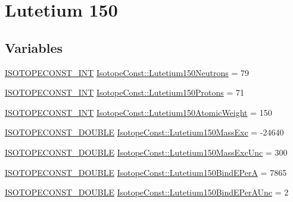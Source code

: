\hypertarget{group___isotope_const-_lutetium-_lu150}{}\section{Lutetium 150}
\label{group___isotope_const-_lutetium-_lu150}
\subsection*{Variables}
\begin{DoxyCompactItemize}
\item 
\mbox{\hyperlink{group___isotope_const-_macros_ga5f18360b3e99483a35c32d789e62621c}{I\+S\+O\+T\+O\+P\+E\+C\+O\+N\+S\+T\+\_\+\+I\+NT}} \mbox{\hyperlink{group___isotope_const-_lutetium-_lu150_ga0face9809013d9d7120bab64be048471}{Isotope\+Const\+::\+Lutetium150\+Neutrons}} = 79
\item 
\mbox{\hyperlink{group___isotope_const-_macros_ga5f18360b3e99483a35c32d789e62621c}{I\+S\+O\+T\+O\+P\+E\+C\+O\+N\+S\+T\+\_\+\+I\+NT}} \mbox{\hyperlink{group___isotope_const-_lutetium-_lu150_ga98659f94cfe65d69b218bcfa981c9f98}{Isotope\+Const\+::\+Lutetium150\+Protons}} = 71
\item 
\mbox{\hyperlink{group___isotope_const-_macros_ga5f18360b3e99483a35c32d789e62621c}{I\+S\+O\+T\+O\+P\+E\+C\+O\+N\+S\+T\+\_\+\+I\+NT}} \mbox{\hyperlink{group___isotope_const-_lutetium-_lu150_ga633669483099b9b6863d16f018193497}{Isotope\+Const\+::\+Lutetium150\+Atomic\+Weight}} = 150
\item 
\mbox{\hyperlink{group___isotope_const-_macros_ga8f45a7272ce02c0b4c65c44636ed719a}{I\+S\+O\+T\+O\+P\+E\+C\+O\+N\+S\+T\+\_\+\+D\+O\+U\+B\+LE}} \mbox{\hyperlink{group___isotope_const-_lutetium-_lu150_ga2fc9d0c5eda09ada03fd0eca210cc907}{Isotope\+Const\+::\+Lutetium150\+Mass\+Exc}} = -\/24640
\item 
\mbox{\hyperlink{group___isotope_const-_macros_ga8f45a7272ce02c0b4c65c44636ed719a}{I\+S\+O\+T\+O\+P\+E\+C\+O\+N\+S\+T\+\_\+\+D\+O\+U\+B\+LE}} \mbox{\hyperlink{group___isotope_const-_lutetium-_lu150_ga9104f8d89702984a3599350263017f30}{Isotope\+Const\+::\+Lutetium150\+Mass\+Exc\+Unc}} = 300
\item 
\mbox{\hyperlink{group___isotope_const-_macros_ga8f45a7272ce02c0b4c65c44636ed719a}{I\+S\+O\+T\+O\+P\+E\+C\+O\+N\+S\+T\+\_\+\+D\+O\+U\+B\+LE}} \mbox{\hyperlink{group___isotope_const-_lutetium-_lu150_ga0d518f995e20f69c696435dc668bf9b2}{Isotope\+Const\+::\+Lutetium150\+Bind\+E\+PerA}} = 7865
\item 
\mbox{\hyperlink{group___isotope_const-_macros_ga8f45a7272ce02c0b4c65c44636ed719a}{I\+S\+O\+T\+O\+P\+E\+C\+O\+N\+S\+T\+\_\+\+D\+O\+U\+B\+LE}} \mbox{\hyperlink{group___isotope_const-_lutetium-_lu150_ga760446fc5b38b76a85535f1b2e7e7898}{Isotope\+Const\+::\+Lutetium150\+Bind\+E\+Per\+A\+Unc}} = 2

\end{DoxyCompactItemize}
